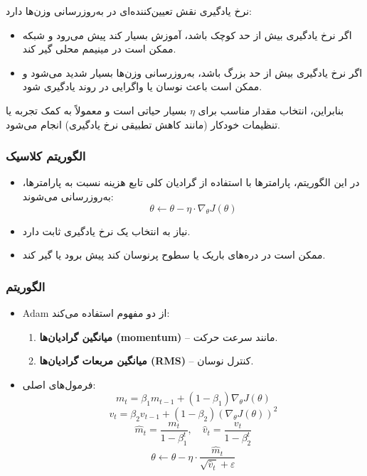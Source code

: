 نرخ یادگیری نقش تعیین‌کننده‌ای در به‌روزرسانی وزن‌ها دارد:
\begin{itemize}
	\item اگر نرخ یادگیری بیش از حد کوچک باشد، آموزش بسیار کند پیش می‌رود و شبکه ممکن است در مینیمم محلی گیر کند.
	\item اگر نرخ یادگیری بیش از حد بزرگ باشد، به‌روزرسانی وزن‌ها بسیار شدید می‌شود و ممکن است باعث نوسان یا واگرایی در روند یادگیری شود.
\end{itemize}

بنابراین، انتخاب مقدار مناسب برای $\eta$ بسیار حیاتی است و معمولاً به کمک تجربه یا تنظیمات خودکار (مانند کاهش تطبیقی نرخ یادگیری) انجام می‌شود.




\subsubsection*{الگوریتم  کلاسیک}

\begin{itemize}
	\item در این الگوریتم، پارامترها با استفاده از گرادیان کلی تابع هزینه نسبت به پارامترها، به‌روزرسانی می‌شوند:
	\[
	\theta \leftarrow \theta - \eta \cdot \nabla_\theta J(\theta)
	\]
	\item نیاز به انتخاب یک نرخ یادگیری ثابت دارد.
	\item ممکن است در دره‌های باریک یا سطوح پرنوسان کند پیش برود یا گیر کند.
\end{itemize}

\subsubsection*{الگوریتم }

\begin{itemize}
	\item Adam از دو مفهوم استفاده می‌کند:
	\begin{enumerate}
		\item \textbf{میانگین گرادیان‌ها (momentum)} – مانند سرعت حرکت.
		\item \textbf{میانگین مربعات گرادیان‌ها (RMS)} – کنترل نوسان.
	\end{enumerate}
	\item فرمول‌های اصلی:
	\[
	m_t = \beta_1 m_{t-1} + (1 - \beta_1) \nabla_\theta J(\theta)
	\]
	\[
	v_t = \beta_2 v_{t-1} + (1 - \beta_2) (\nabla_\theta J(\theta))^2
	\]
	\[
	\hat{m}_t = \frac{m_t}{1 - \beta_1^t}, \quad \hat{v}_t = \frac{v_t}{1 - \beta_2^t}
	\]
	\[
	\theta \leftarrow \theta - \eta \cdot \frac{\hat{m}_t}{\sqrt{\hat{v}_t} + \varepsilon}
	\]
\end{itemize}

